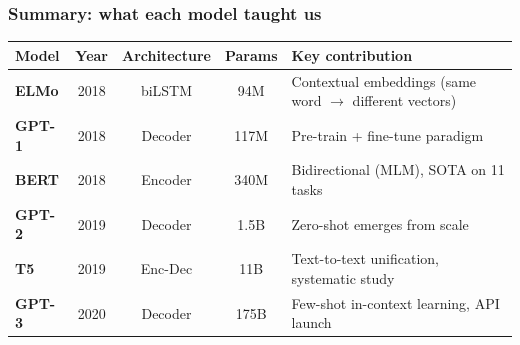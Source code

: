 \documentclass[aspectratio=169]{beamer}
\begin{document}
\begin{frame}
\frametitle{Summary: what each model taught us}

\vspace{-0.2cm}
\renewcommand{\arraystretch}{1.35}
\begin{center}
{\scriptsize
\begin{tabular}{>{\bfseries}l c c c l}
  \textbf{Model} & \textbf{Year} & \textbf{Architecture} & \textbf{Params} & \textbf{Key contribution} \\
  \hline
  \textcolor{violet1}{ELMo} & 2018 & biLSTM & 94M & Contextual embeddings (same word $\to$ different vectors) \\[1pt]
  \textcolor{popblue}{GPT-1} & 2018 & Decoder & 117M & Pre-train + fine-tune paradigm \\[1pt]
  \textcolor{paramgreen}{BERT} & 2018 & Encoder & 340M & Bidirectional (MLM), SOTA on 11 tasks \\[1pt]
  \textcolor{orange1}{GPT-2} & 2019 & Decoder & 1.5B & Zero-shot emerges from scale \\[1pt]
  \textcolor{sampred}{T5} & 2019 & Enc-Dec & 11B & Text-to-text unification, systematic study \\[1pt]
  \textcolor{warnred}{GPT-3} & 2020 & Decoder & 175B & Few-shot in-context learning, API launch \\
  \hline
\end{tabular}
}
\end{center}

\vspace{0.1cm}
\begin{center}
\end{center}
\end{frame}
\end{document}
